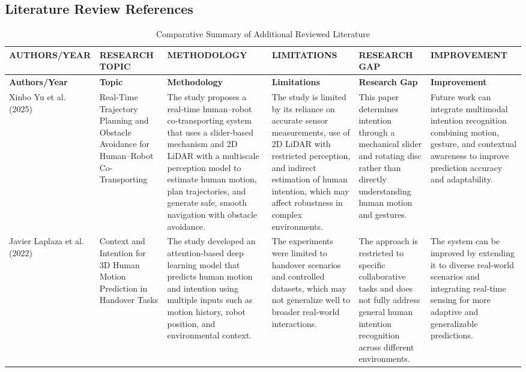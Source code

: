 \begin{landscape}

\section{Literature Review References}

\footnotesize

\begin{longtable}{|
>{\RaggedRight\arraybackslash}p{3cm}|
>{\RaggedRight\arraybackslash}p{3cm}|
>{\RaggedRight\arraybackslash}p{5cm}|
>{\RaggedRight\arraybackslash}p{4cm}|
>{\RaggedRight\arraybackslash}p{4cm}|
>{\RaggedRight\arraybackslash}p{4cm}|
}
\caption{Comparative Summary of Additional Reviewed Literature}
\label{tab:lit_review_landscape}\\
\hline
\textbf{AUTHORS/YEAR} & 
\textbf{RESEARCH TOPIC} & 
\textbf{METHODOLOGY} & 
\textbf{LIMITATIONS} & 
\textbf{RESEARCH GAP} & 
\textbf{IMPROVEMENT} \\
\hline
\endfirsthead

\hline
\textbf{Authors/Year} & 
\textbf{Topic} & 
\textbf{Methodology} & 
\textbf{Limitations} & 
\textbf{Research Gap} & 
\textbf{Improvement} \\
\hline
\endhead

Xinbo Yu et al. (2025) \cite{yu2024} &
Real-Time Trajectory Planning and Obstacle Avoidance for Human--Robot Co-Transporting &
The study proposes a real-time human–robot co-transporting system that uses a slider-based mechanism and 2D LiDAR with a multiscale perception model to estimate human motion, plan trajectories, and generate safe, smooth navigation with obstacle avoidance. &

The study is limited by its reliance on accurate sensor measurements, use of 2D LiDAR with restricted perception, and indirect estimation of human intention, which may affect robustness in complex environments.&

This paper determines intention through a mechanical slider and rotating disc rather than directly understanding human motion and gestures. &
Future work can integrate multimodal intention recognition combining motion, gesture, and contextual awareness to improve prediction accuracy and adaptability. \\
\hline

Javier Laplaza et al. (2022) \cite{laplaza2022} &
Context and Intention for 3D Human Motion Prediction in Handover Tasks &
The study developed an attention-based deep learning model that predicts human motion and intention using multiple inputs such as motion history, robot position, and environmental context. &
The experiments were limited to handover scenarios and controlled datasets, which may not generalize well to broader real-world interactions. &
The approach is restricted to specific collaborative tasks and does not fully address general human intention recognition across different environments. &
The system can be improved by extending it to diverse real-world scenarios and integrating real-time sensing for more adaptive and generalizable predictions. \\
\hline


\end{longtable}
\end{landscape}
